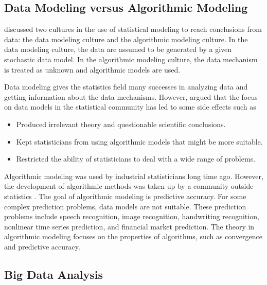 \documentclass[12pt]{article}
\begin{document}
 

\subsection{Data Modeling versus Algorithmic Modeling}

\cite{breiman2001modeling} discussed two cultures in the use of statistical modeling to reach conclusions from data: the data modeling culture and the algorithmic modeling culture. In the data modeling culture, the data are assumed to be generated by a given stochastic data model. In the algorithmic modeling culture, the data mechanism is treated as unknown and algorithmic models are used.

Data modeling gives the statistics field many successes in analyzing data and getting information about the data mechanisms. However, \cite{breiman2001modeling} argued that the focus  on data models in the statistical community has led to some side effects such as
\begin{itemize}
\item Produced irrelevant theory and questionable scientific conclusions.
\item Kept statisticians from using algorithmic models that might be more suitable.
\item Restricted the ability of statisticians to deal with a wide range of problems.
\end{itemize}

Algorithmic modeling was used by industrial statisticians long time ago. However, the development of algorithmic methods was taken up by a community outside statistics \citep{breiman2001modeling}. The goal of algorithmic modeling is predictive accuracy. For some complex prediction problems, data models are not suitable. These prediction problems include speech recognition, image recognition, handwriting recognition, nonlinear time series prediction, and financial market prediction. The theory in algorithmic modeling focuses on the properties of algorithms, such as convergence and predictive accuracy. 

\subsection{Big Data Analysis}
\end{document}
